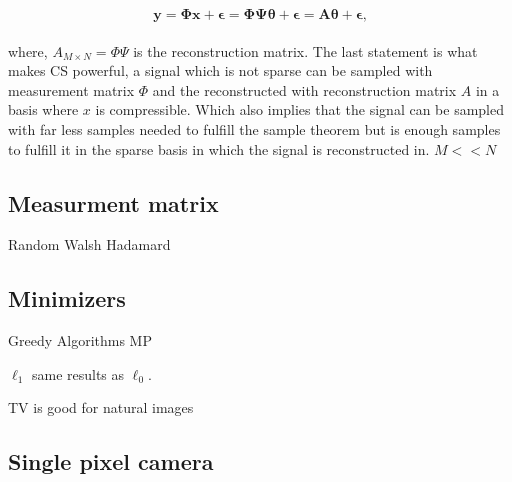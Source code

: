 \begin{equation}
   \mathbf{ y = \Phi x + \epsilon = \Phi \Psi \theta + \epsilon = A \theta + \epsilon }\text{,}
\end{equation}\\[0.1in]

where, $A_{M \times N} = \Phi \Psi$ is the reconstruction matrix. The last statement is what makes CS powerful, a signal which is not sparse can be sampled with measurement matrix $\Phi$ and the reconstructed with reconstruction matrix $A$ in a basis where $x$ is compressible. Which also implies that the signal can be sampled with far less samples needed to fulfill the sample theorem but is enough samples to fulfill it in the sparse basis in which the signal is reconstructed in. $M << N$



\subsection{Measurment matrix}
Random 
Walsh Hadamard

\subsection{Minimizers}
Greedy Algorithms MP

$\ell_1$ \cite{article:CS_donoho1} same results as $\ell_0$.

TV is good for natural images \cite{article:TVAL3, article:hiresswir}

\subsection{Single pixel camera}